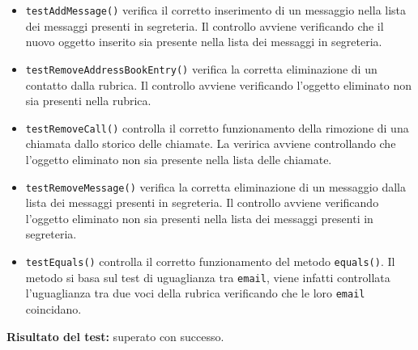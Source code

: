 \begin{itemize}
\begin{itemize}
\item \texttt{testAddMessage()}  verifica il corretto inserimento di un messaggio nella lista dei messaggi presenti in segreteria.
Il controllo avviene verificando che il nuovo oggetto inserito sia presente nella lista dei messaggi in segreteria. 

\item \texttt{testRemoveAddressBookEntry()} verifica la corretta eliminazione di un contatto dalla rubrica.
Il controllo avviene verificando l'oggetto eliminato non sia presenti nella rubrica.  

\item \texttt{testRemoveCall()} controlla il corretto funzionamento della rimozione di una chiamata dallo storico delle chiamate. La veririca avviene controllando che l'oggetto eliminato non sia presente nella lista delle chiamate.

\item \texttt{testRemoveMessage()} verifica la corretta eliminazione di un messaggio dalla lista dei messaggi presenti in segreteria.
Il controllo avviene verificando l'oggetto eliminato non sia presenti nella lista dei messaggi presenti in segreteria. 

\item \texttt{testEquals()} controlla  il corretto funzionamento del metodo \texttt{equals()}. Il metodo si basa sul test di uguaglianza tra \texttt{email}, viene infatti controllata l'uguaglianza tra due voci della rubrica verificando che le loro \texttt{email} coincidano. 

\end{itemize}
\textbf{Risultato del test:} superato con successo.
\end{itemize}

